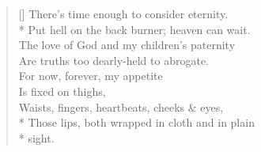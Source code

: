\begin{verse}[\versewidth]
    There's time enough to consider eternity.\\*
    \vin Put hell on the back burner; heaven can wait.\\
    The love of God and my children's paternity\\
    \vin Are truths too dearly-held to abrogate.\\
    \vin \vin For now, forever, my appetite\\
    \vin \vin \vin Is fixed on thighs,\\
    \vin \vin \vin Waists, fingers, heartbeats, cheeks \& eyes,\\*
    \vin \vin Those lips, both wrapped in cloth and in plain\\*
    \vin \vin \vin \vin sight.
\end{verse}
